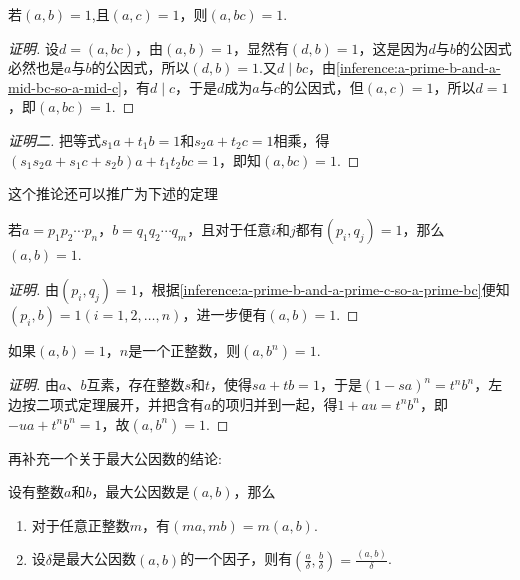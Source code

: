 \begin{inference}
  \label{inference:a-prime-b-and-a-prime-c-so-a-prime-bc}
  若$(a,b)=1$,且$(a,c)=1$，则$(a,bc)=1$.
\end{inference}

\begin{proof}[证明]
  设$d=(a,bc)$，由$(a,b)=1$，显然有$(d,b)=1$，这是因为$d$与$b$的公因式必然也是$a$与$b$的公因式，所以$(d,b)=1$.又$d \mid bc$，由\autoref{inference:a-prime-b-and-a-mid-bc-so-a-mid-c}，有$d \mid c$，于是$d$成为$a$与$c$的公因式，但$(a,c)=1$，所以$d=1$，即$(a,bc)=1$.
\end{proof}

\begin{proof}[证明二]
  把等式$s_1a+t_1b=1$和$s_2a+t_2c=1$相乘，得$(s_1s_2a+s_1c+s_2b)a+t_1t_2bc=1$，即知$(a,bc)=1$.
\end{proof}

这个推论还可以推广为下述的定理
\begin{theorem}
  \label{theorem:two-group-prime-without-repeat-prime-each-other}
  若$a=p_1p_2 \cdots p_n$，$b=q_1q_2 \cdots q_m$，且对于任意$i$和$j$都有$(p_i,q_j)=1$，那么$(a,b)=1$.
\end{theorem}

\begin{proof}[证明]
 由$(p_i,q_j)=1$，根据\autoref{inference:a-prime-b-and-a-prime-c-so-a-prime-bc}便知$(p_i, b)=1(i=1,2,\ldots,n)$，进一步便有$(a,b)=1$.
\end{proof}

\begin{theorem}
  如果$(a,b)=1$，$n$是一个正整数，则$(a,b^n)=1$.
\end{theorem}

\begin{proof}[证明]
  由$a$、$b$互素，存在整数$s$和$t$，使得$sa+tb=1$，于是$(1-sa)^n=t^nb^n$，左边按二项式定理展开，并把含有$a$的项归并到一起，得$1+au=t^nb^n$，即$-ua+t^nb^n=1$，故$(a,b^n)=1$.
\end{proof}

再补充一个关于最大公因数的结论:
\begin{theorem}
  设有整数$a$和$b$，最大公因数是$(a,b)$，那么
  \begin{enumerate}
  \item 对于任意正整数$m$，有$(ma, mb)=m(a,b)$.
  \item 设$\delta$是最大公因数$(a,b)$的一个因子，则有$(\frac{a}{\delta}, \frac{b}{\delta})=\frac{(a,b)}{\delta}$.
  \end{enumerate}
\end{theorem}


